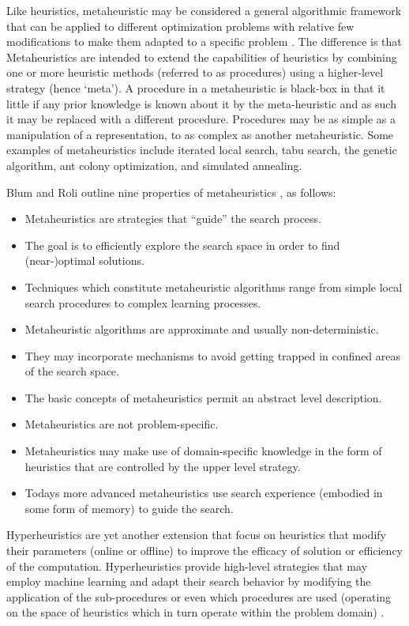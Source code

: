 \documentclass[a4paper, 11pt]{article}
\begin{document}
Like heuristics, metaheuristic may be considered a general algorithmic framework that can be applied to different optimization problems with relative few modifications to make them adapted to a specific problem \cite{Glover2003, Talbi2009}. The difference is that Metaheuristics are intended to extend the capabilities of heuristics by combining one or more heuristic methods (referred to as procedures) using a higher-level strategy (hence `meta'). A procedure in a metaheuristic is black-box in that it little if any prior knowledge is known about it by the meta-heuristic and as such it may be replaced with a different procedure. Procedures may be as simple as a manipulation of a representation, to as complex as another metaheuristic. Some examples of metaheuristics include iterated local search, tabu search, the genetic algorithm, ant colony optimization, and simulated annealing.

Blum and Roli outline nine properties of metaheuristics \cite{Blum2003}, as follows: 
\begin{itemize}
	\item Metaheuristics are strategies that ``guide'' the search process.
	\item The goal is to efficiently explore the search space in order to find (near-)optimal solutions.
	\item Techniques which constitute metaheuristic algorithms range from simple local search procedures to complex learning processes.
	\item Metaheuristic algorithms are approximate and usually non-deterministic.
	\item They may incorporate mechanisms to avoid getting trapped in confined areas of the search space.
	\item The basic concepts of metaheuristics permit an abstract level description.
	\item Metaheuristics are not problem-specific.
	\item Metaheuristics may make use of domain-specific knowledge in the form of heuristics that are controlled by the upper level strategy.
	\item Todays more advanced metaheuristics use search experience (embodied in some form of memory) to guide the search.
\end{itemize}

Hyperheuristics are yet another extension that focus on heuristics that modify their parameters (online or offline) to improve the efficacy of solution or efficiency of the computation. Hyperheuristics provide high-level strategies that may employ machine learning and adapt their search behavior by modifying the application of the sub-procedures or even which procedures are used (operating on the space of heuristics which in turn operate within the problem domain) \cite{Burke2003a, Burke2003}. 
\end{document}
